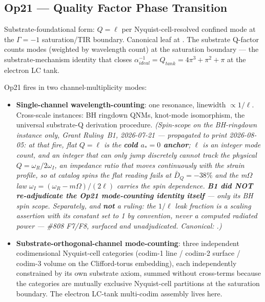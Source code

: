\subsection{Op21 --- Quality Factor Phase Transition}

Substrate-foundational form: $Q = \ell$ per Nyquist-cell-resolved confined mode at the $\Gamma = -1$\gammaundeclared{} saturation/TIR boundary. Canonical leaf at . The substrate Q-factor counts modes (weighted by wavelength count) at the saturation boundary --- the substrate-mechanism identity that closes $\alpha^{-1}_{ideal} = Q_{tank} = 4\pi^3 + \pi^2 + \pi$ at the electron LC tank.

Op21 fires in two channel-multiplicity modes:

\begin{itemize}
    \item \textbf{Single-channel wavelength-counting}: one resonance, linewidth $\propto 1/\ell$. Cross-scale instances: BH ringdown QNMs, knot-mode isomorphism, the universal substrate-Q derivation procedure. \emph{(Spin-scope on the BH-ringdown instance only, Grant Ruling~B1, 2026-07-21 --- propagated to print 2026-08-05: at that fire, flat $Q = \ell$ is the \textbf{cold $a_* = 0$ anchor}; $\ell$ is an integer mode count, and an integer that can only jump discretely cannot track the physical $Q = \omega_R/2\omega_I$, an impedance ratio that moves continuously with the strain profile, so at catalog spins the flat reading fails at $\bar{D}_Q = -38\%$ and the m$\Omega$ law $\omega_I = (\omega_R - m\Omega)/(2\ell)$ carries the spin dependence. \textbf{B1 did NOT re-adjudicate the Op21 mode-counting identity itself} --- only its BH spin scope. Separately, and \textbf{not} a ruling: the $1/\ell$ leak fraction is a scaling assertion with its constant set to 1 by convention, never a computed radiated power --- \#808 F7/F8, surfaced and unadjudicated. Canonical: .)}
    \item \textbf{Substrate-orthogonal-channel mode-counting}: three independent codimensional Nyquist-cell categories (codim-1 line / codim-2 surface / codim-3 volume on the Clifford-torus embedding), each independently constrained by its own substrate axiom, summed without cross-terms because the categories are mutually exclusive Nyquist-cell partitions at the saturation boundary. The electron LC-tank multi-codim assembly lives here.
\end{itemize}

